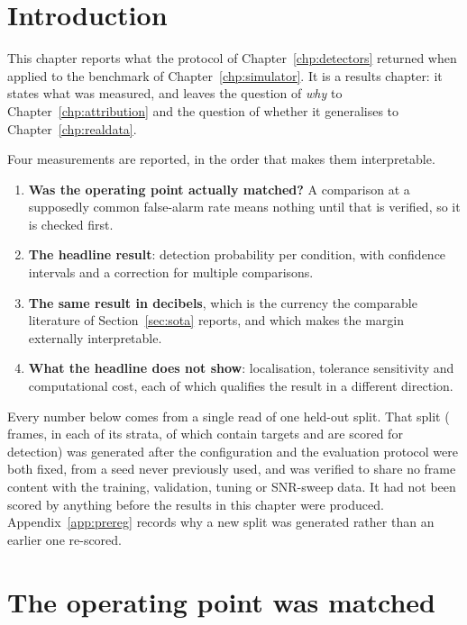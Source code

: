 
\section{Introduction}

This chapter reports what the protocol of Chapter~\ref{chp:detectors} returned when applied to the
benchmark of Chapter~\ref{chp:simulator}. It is a results chapter: it states what was measured, and
leaves the question of \emph{why} to Chapter~\ref{chp:attribution} and the question of whether it
generalises to Chapter~\ref{chp:realdata}.

Four measurements are reported, in the order that makes them interpretable.

\begin{enumerate}
\itemsep2pt
\item \textbf{Was the operating point actually matched?} A comparison at a supposedly common
false-alarm rate means nothing until that is verified, so it is checked first.
\item \textbf{The headline result}: detection probability per condition, with confidence intervals
and a correction for multiple comparisons.
\item \textbf{The same result in decibels}, which is the currency the comparable literature of
Section~\ref{sec:sota} reports, and which makes the margin externally interpretable.
\item \textbf{What the headline does not show}: localisation, tolerance sensitivity and
computational cost, each of which qualifies the result in a different direction.
\end{enumerate}

Every number below comes from a single read of one held-out split. That split
(\SynHoldoutFrames{} frames, \SynFramesPerCondition{} in each of its \SynHoldoutStrata{} strata,
of which \SynScoredFrames{} contain targets and are scored for detection) was generated after the
configuration and the evaluation protocol were both fixed, from a seed never previously used, and
was verified to share no frame content with the training, validation, tuning or SNR-sweep data. It
had not been scored by anything before the results in this chapter were produced.
Appendix~\ref{app:prereg} records why a new split was generated rather than an earlier one
re-scored.

\section{The operating point was matched}

